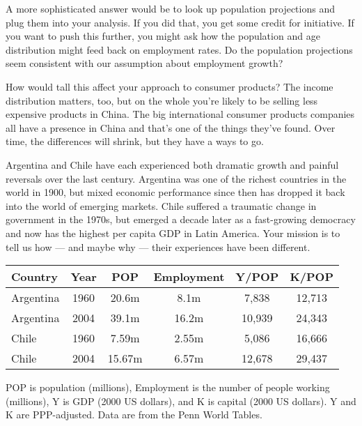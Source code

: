 \documentclass[letterpaper,12pt]{exam}
\begin{document}
\begin{questions}
\begin{solution}
\begin{parts}
A more sophisticated answer would be to look up population projections
and plug them into your analysis.  
If you did that, you get some credit for initiative.
If you want to push this further, you might ask how 
the population and age distribution might feed back on
employment rates.  
Do the population projections seem consistent with our 
assumption about employment growth?  

How would tall this affect your approach to consumer products?
The income distribution matters, too, 
but on the whole you're likely to be selling less
expensive products in China.  
The big international consumer products companies all 
have a presence in China and that's one of the things
they've found.
Over time, the differences will shrink, but they have a 
ways to go.  
\end{parts}
\end{solution} 


Argentina and Chile have each experienced 
both dramatic growth and painful reversals over the last century.  
Argentina was one of the richest countries in the world in 1900, 
but mixed economic performance since then has 
dropped it back into the world of emerging markets.  
Chile suffered a traumatic change in government in the 1970s, 
but emerged a decade later as a fast-growing democracy 
and now has the highest per capita GDP in Latin America.  
Your mission is to tell us how --- and maybe why 
--- their experiences have been different.  

\begin{center}
\begin{tabular}{lccccc}
\hline\hline
Country   &  Year   &  POP   &  Employment &  Y/POP &  K/POP  \\
\hline\hline
Argentina \hspace*{0.1in} &  1960   &  20.6m &  \phantom{1}8.1m   
                &  \phantom{1}7,838  &  12,713  \\
Argentina &  2004   &  39.1m &  16.2m             &  10,939 &  24,343  \\
Chile   &  1960  & 7.59m &  2.55m   
                &  \phantom{1}5,086   &   16,666  \\
Chile     &  2004   & 15.67m\phantom{1} &  6.57m   &  12,678  &  29,437  \\
\hline\hline
\end{tabular}
\end{center}
POP is population (millions), Employment is the number of people working 
(millions), Y is GDP (2000 US dollars), 
and K is capital (2000 US dollars).  
Y and K are PPP-adjusted.  
Data are from the Penn World Tables.  


\end{questions}
\end{document}
